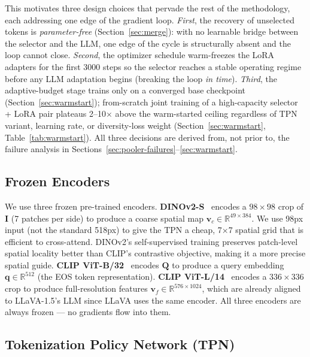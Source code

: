 \documentclass{article}
\newcommand{\vcoarse}{\mathbf{v}_{c}}
\newcommand{\vfine}{\mathbf{v}_{f}}
\newcommand{\qemb}{\mathbf{q}}
\begin{document}
This motivates three design choices that pervade the rest of the
methodology, each addressing one edge of the gradient loop.
\emph{First}, the recovery of unselected tokens is \emph{parameter-free}
(Section~\ref{sec:merge}): with no learnable bridge between the
selector and the LLM, one edge of the cycle is structurally absent and
the loop cannot close. \emph{Second}, the optimizer schedule
warm-freezes the LoRA adapters for the first 3000 steps so the selector
reaches a stable operating regime before any LLM adaptation begins
(breaking the loop \emph{in time}). \emph{Third}, the adaptive-budget
stage trains only on a converged base checkpoint
(Section~\ref{sec:warmstart}); from-scratch joint training of a
high-capacity selector + LoRA pair plateaus 2--10$\times$ above the
warm-started ceiling regardless of TPN variant, learning rate, or
diversity-loss weight (Section~\ref{sec:warmstart},
Table~\ref{tab:warmstart}). All three decisions are derived from, not
prior to, the failure analysis in
Sections~\ref{sec:pooler-failures}--\ref{sec:warmstart}.

\subsection{Frozen Encoders}
\label{sec:encoders}

We use three frozen pre-trained encoders.
\textbf{DINOv2-S}~\cite{oquab2023dinov2} encodes a $98\times98$ crop of $\mathbf{I}$
(7 patches per side) to produce a coarse spatial map
$\vcoarse \in \mathbb{R}^{49 \times 384}$.
We use 98px input (not the standard 518px) to give the TPN a cheap,
7$\times$7 spatial grid that is efficient to cross-attend.
DINOv2's self-supervised training preserves patch-level spatial locality better than
CLIP's contrastive objective, making it a more precise spatial guide.
\textbf{CLIP ViT-B/32}~\cite{radford2021clip} encodes $\mathbf{Q}$ to produce a
query embedding $\qemb \in \mathbb{R}^{512}$ (the EOS token representation).
\textbf{CLIP ViT-L/14}~\cite{radford2021clip} encodes a $336\times336$ crop to
produce full-resolution features $\vfine \in \mathbb{R}^{576 \times 1024}$, which
are already aligned to LLaVA-1.5's LLM since LLaVA uses the same encoder.
All three encoders are always frozen — no gradients flow into them.

\subsection{Tokenization Policy Network (TPN)}
\label{sec:tpn}
\end{document}

